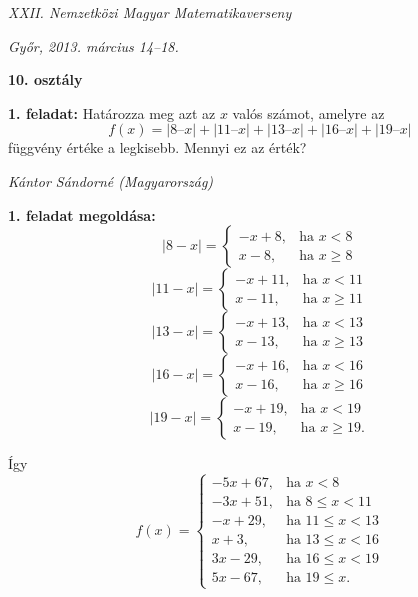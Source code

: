 \documentclass[a4paper,10pt]{article}
\def\ki#1#2{\hfill {\it #1 (#2)}\medskip}
\begin{document}
\begin{center} \Large {\em XXII. Nemzetközi Magyar Matematikaverseny} \end{center}
\begin{center} \large{\em Győr, 2013. március 14--18.} \end{center}
\smallskip
\begin{center} \large{\bf 10. osztály} \end{center}
\bigskip 

{\bf 1. feladat: }
Határozza meg azt az $x$ valós számot, amelyre az
$$f(x) = |8 – x| + | 11 – x | + | 13 – x | + | 16 – x | + | 19 – x |$$
függvény értéke a legkisebb. Mennyi ez az érték?

\ki{Kántor Sándorné}{Magyarország}\medskip

{\bf 1. feladat megoldása: }
\begin{equation*}
|8-x|=\begin{cases}
-x+8, & \text{ha } x < 8 \\
x-8, & \text{ha } x\ge 8
\end{cases}
\end{equation*}
\begin{equation*}
|11-x|=\begin{cases}
-x+11, & \text{ha } x < 11 \\
x-11, & \text{ha } x\ge 11
\end{cases}
\end{equation*}
\begin{equation*}
|13-x|=\begin{cases}
-x+13, & \text{ha } x < 13 \\
x-13, & \text{ha } x\ge 13
\end{cases}
\end{equation*}
\begin{equation*}
|16-x|=\begin{cases}
-x+16, & \text{ha } x < 16 \\
x-16, & \text{ha } x\ge 16
\end{cases}
\end{equation*}
\begin{equation*}
|19-x|=\begin{cases}
-x+19, & \text{ha } x < 19 \\
x-19, & \text{ha } x\ge 19.
\end{cases}
\end{equation*}

Így
\begin{equation*}
f(x)=\begin{cases}
-5x+67, & \text{ha } x < 8 \\
-3x+51, & \text{ha } 8\le x < 11\\
-x+29, & \text{ha } 11\le x < 13\\
x+3, & \text{ha } 13\le x < 16\\
3x-29, & \text{ha } 16\le x < 19\\
5x-67, & \text{ha } 19 \le x.
\end{cases}
\end{equation*}
\end{document}

